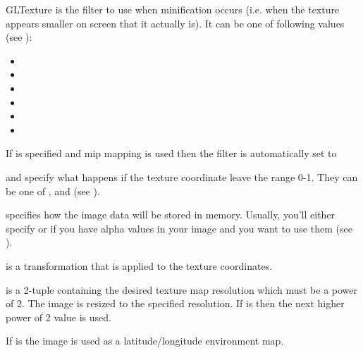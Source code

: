 \begin{classdesc}{GLTexture}
 is the filter to use when minification occurs (i.e. when
the texture appears smaller on screen that it actually is). It can be one
of following values
(see ):

\begin{itemize}
\item {}
\item {}
\item {}
\item {}
\item {}
\item {}
\end{itemize}

If  is specified and mip mapping
is used then the filter is automatically set to 

 and  specify what happens if the texture coordinate
leave the range 0-1. They can be one of , 
and 
(see ).

 specifies how the image data will be stored in memory.
Usually, you'll either specify  or  if you have
alpha values in your image and you want to use them
(see ).

 is a transformation that is applied to the texture coordinates.

 is a 2-tuple containing the desired texture map resolution which
must be a power of 2. The image is resized to the specified resolution.
If  is  then the next higher power of 2 value is used.

If  is  the image is used as a 
latitude/longitude environment map.

\end{classdesc}

